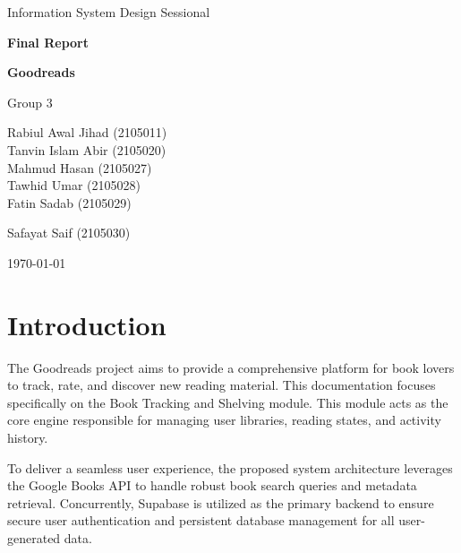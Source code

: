 \documentclass[12pt, a4paper]{report}
\begin{document}
\begin{titlepage}
    \centering
    \vspace*{1in}
    
    {\Large Information System Design Sessional \par}
    \vspace{0.5cm}
    {\LARGE \textbf{Final Report} \par}
    \vspace{1.5cm}
    {\Huge \textbf{Goodreads} \par}
    \vspace{0.5cm}
    {\Large Group 3 \par}
    
    \vfill
    
    {\large Rabiul Awal Jihad (2105011) \\}
    {\large Tanvin Islam Abir (2105020) \\}
    {\large Mahmud Hasan (2105027) \\}
    {\large Tawhid Umar (2105028) \\}
    {\large Fatin Sadab (2105029) \\}
    {\large Safayat Saif (2105030)\par}
    
    \vfill
    
    {\large \today \par}
    \vspace{0.5in}
\end{titlepage}

\tableofcontents
\newpage

\chapter{Introduction}

The Goodreads project aims to provide a comprehensive platform for book lovers to track, rate, and discover new reading material. This documentation focuses specifically on the Book Tracking and Shelving module. This module acts as the core engine responsible for managing user libraries, reading states, and activity history. 

To deliver a seamless user experience, the proposed system architecture leverages the Google Books API to handle robust book search queries and metadata retrieval. Concurrently, Supabase is utilized as the primary backend to ensure secure user authentication and persistent database management for all user-generated data.
\end{document}

